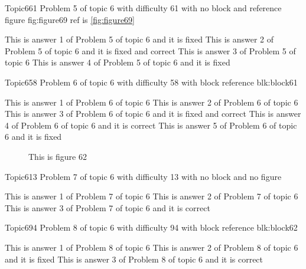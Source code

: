 \documentclass[master]{exam}
\begin{document}
\begin{problem}{Topic6}{61}
	Problem 5 of topic 6 with difficulty 61 with no block and reference figure fig:figure69 ref is \ref{fig:figure69}
	\begin{answers}
		\answer[fixed] This is answer 1 of Problem 5 of topic 6 and it is fixed
		 This is answer 2 of Problem 5 of topic 6 and it is fixed and correct
		\answer This is answer 3 of Problem 5 of topic 6 
		\answer[fixed] This is answer 4 of Problem 5 of topic 6 and it is fixed
	\end{answers}
\end{problem}

\begin{problem}[requires=blk:block61]{Topic6}{58}
	Problem 6 of topic 6 with difficulty 58 with block reference blk:block61
	\begin{answers}
		\answer This is answer 1 of Problem 6 of topic 6 
		\answer This is answer 2 of Problem 6 of topic 6 
		 This is answer 3 of Problem 6 of topic 6 and it is fixed and correct
		\answer[correct] This is answer 4 of Problem 6 of topic 6 and it is correct
		\answer[fixed] This is answer 5 of Problem 6 of topic 6 and it is fixed
	\end{answers}
\end{problem}



\begin{figure}
	\begin{center}
		This is figure 62 
		\label{fig:figure62}
	\end{center}
\end{figure}

\begin{problem}{Topic6}{13}
	Problem 7 of topic 6 with difficulty 13 with no block and no figure
	\begin{answers}
		\answer This is answer 1 of Problem 7 of topic 6 
		\answer This is answer 2 of Problem 7 of topic 6 
		\answer[correct] This is answer 3 of Problem 7 of topic 6 and it is correct
	\end{answers}
\end{problem}

\begin{problem}[requires=blk:block62]{Topic6}{94}
	Problem 8 of topic 6 with difficulty 94 with block reference blk:block62
	\begin{answers}
		\answer This is answer 1 of Problem 8 of topic 6 
		\answer[fixed] This is answer 2 of Problem 8 of topic 6 and it is fixed
		\answer[correct] This is answer 3 of Problem 8 of topic 6 and it is correct
	\end{answers}
\end{problem}
\end{document}
